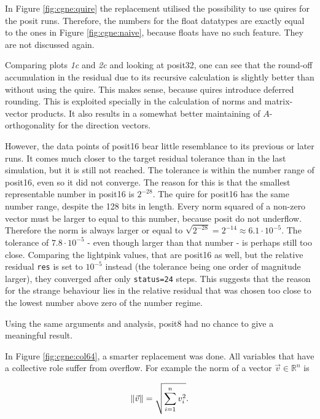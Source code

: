\documentclass{article}
\theoremstyle{plain} %
\theoremstyle{convention} %
\theoremstyle{remark} %
\def\code#1{\texttt{#1}}
\numberwithin{equation}{section}
\begin{document}
In Figure \ref{fig:cgne:quire} the replacement utilised the possibility to use \glspl{quire} for the posit runs. Therefore, the numbers for the float datatypes are exactly equal to the ones in Figure \ref{fig:cgne:naive}, because floats have no such feature. They are not discussed again.

Comparing plots \textit{1c} and \textit{2c} and looking at \gls{posit32}, one can see that the round-off accumulation in the residual due to its recursive calculation is slightly better than without using the \gls{quire}. This makes sense, because \glspl{quire} introduce deferred rounding. This is exploited specially in the calculation of norms and matrix-vector products. It also results in a somewhat better maintaining of $A$-orthogonality for the direction vectors.

However, the data points of \gls{posit16} bear little resemblance to its previous or later runs. It comes much closer to the target residual tolerance than in the last simulation, but it is still not reached. The tolerance is within the number range of \gls{posit16}, even so it did not converge. The reason for this is that the smallest representable number in \gls{posit16} is $2^{-28}$. The \gls{quire} for \gls{posit16} has the same number range, despite the \num{128} bits in length. Every norm squared of a non-zero vector must be larger to equal to this number, because posit do not underflow. Therefore the norm is always larger or equal to $\sqrt{2^{-28}} = 2^{-14} \approx 6.1 \cdot 10^{-5}$. The tolerance of $7.8 \cdot 10^{-5}$ - even though larger than that number - is perhaps still too close. Comparing the \textcolor{clightpink}{lightpink} values, that are \gls{posit16} as well, but the relative residual \code{res} is set to $10^{-5}$ instead (the tolerance being one order of magnitude larger), they converged after only \code{status=24} steps. This suggests that the reason for the strange behaviour lies in the relative residual that was chosen too close to the lowest number above zero of the number regime.

Using the same arguments and analysis, \gls{posit8} had no chance to give a meaningful result.

In Figure \ref{fig:cgne:col64}, a smarter replacement was done. All variables that have a collective role suffer from overflow. For example the norm of a vector $\vec{v} \in \mathbb{R}^n$ is 

\begin{align*}
    \norm{\vec{v}} = \sqrt{ \sum_{i=1}^{n} v_i^2 }.
\end{align*}
\end{document}
